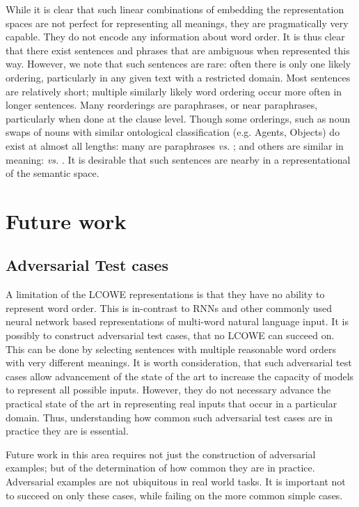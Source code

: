 \documentclass{book}
\begin{document}
While it is clear that such linear combinations of embedding  the representation spaces are not perfect for representing all meanings,
they are pragmatically very capable.
They do not encode any information about word order.
It is thus clear that there exist sentences and phrases that are ambiguous when represented this way.
However, we note that such sentences are rare: often there is only one likely ordering, particularly in any given text with a restricted domain.
Most sentences are relatively short; multiple similarly likely word ordering occur more often in longer sentences.
Many reorderings are paraphrases, or near paraphrases, particularly when done at the clause level.
Though some orderings, such as noun swaps of nouns with similar ontological classification (e.g. Agents, Objects) do exist at almost all lengths:
many are paraphrases  \emph{vs.} ;
and others are similar in meaning:  \emph{vs.} .
It is desirable that such sentences are nearby in a representational of the semantic space.


\section{Future work}

\subsection{Adversarial Test cases}
A limitation of the LCOWE representations is that they have no ability to represent word order.
This is in-contrast to RNNs and other commonly used neural network based representations of multi-word natural language input.
It is possibly to construct adversarial test cases, that no LCOWE can succeed on.
This can be done by selecting sentences with multiple reasonable word orders with very different meanings.
It is worth consideration,
that such adversarial test cases allow advancement of the state of the art to increase the capacity of models to represent all possible inputs.
However, they do not necessary advance the practical state of the art in representing real inputs that occur in a particular domain. 
Thus, understanding how common such adversarial test cases are in practice they are is essential.

Future work in this area requires not just the construction of adversarial examples; but of the determination of how common they are in practice.
Adversarial examples are not ubiquitous in real world tasks.
It is important not to succeed on only these cases, while failing on the more common simple cases.
\end{document}
